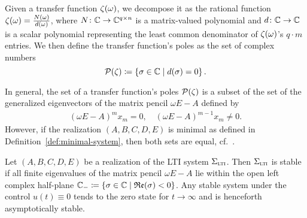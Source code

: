\begin{definition}\label{def:transfer-function-poles}
    Given a transfer function $\zeta(\omega)$, we decompose it as the rational function $\zeta(\omega) = \frac{N(\omega)}{d(\omega)}$, where $N \colon \mathbb{C} \to \mathbb{C}^{q \times n}$ is a matrix-valued polynomial and $d \colon \mathbb{C} \to \mathbb{C}$ is a scalar polynomial representing the least common denominator of $\zeta(\omega)$'s $q \cdot m$ entries.
    We then define the transfer function's poles as the set of complex numbers
    \begin{equation*}
        \mathcal{P}(\zeta) \coloneqq \left\{\sigma \in \mathbb{C}\mid d(\sigma) = 0\right\}.
    \end{equation*}
\end{definition}

\begin{remark}
    In general, the set of a transfer function's poles $\mathcal{P}(\zeta)$ is a subset of the set of the generalized eigenvectors of the matrix pencil $\omega E - A$ defined by
    \begin{align*}
        {(\omega E - A)}^m x_m = 0,\quad {(\omega E - A)}^{m - 1} x_m \neq 0.
    \end{align*}
    However, if the realization $(A, B, C, D, E)$ is minimal as defined in Definition~\ref{def:minimal-system}, then both sets are equal, cf.~\cite[Section~2]{Benner2017}.
\end{remark}

\begin{definition}\label{def:lti-stability}
    Let $(A, B, C, D, E)$ be a realization of the \ac{LTI} system $\Sigma_{\textnormal{\scshape lti}}$.
    Then $\Sigma_{\textnormal{\scshape lti}}$ is stable if all finite eigenvalues of the matrix pencil $\omega E - A$ lie within the open left complex half-plane $\mathbb{C}_{-} \coloneqq \left\{\sigma \in \mathbb{C}\mid\mathfrak{Re}(\sigma) < 0\right\}$.
    Any stable system under the control $u(t) \equiv 0$ tends to the zero state for $t \to \infty$ and is henceforth asymptotically stable.
\end{definition}
